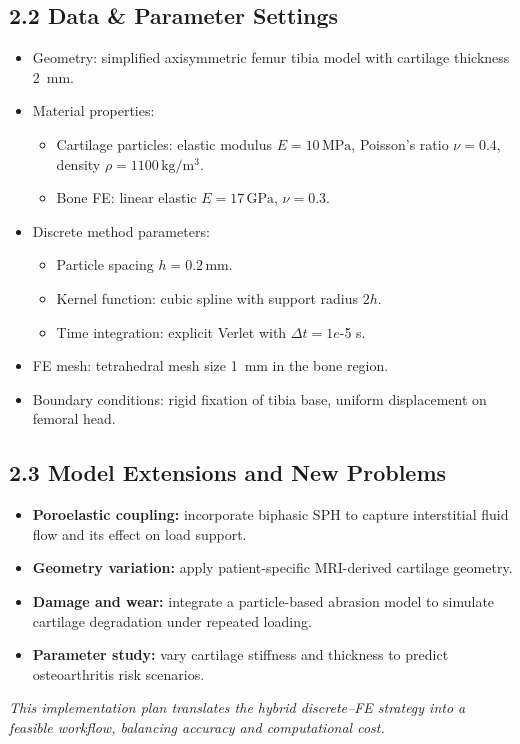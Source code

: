 \documentclass[11pt]{article}
\begin{document}
\subsection*{2.2 Data \& Parameter Settings}
\begin{itemize}
  \item Geometry: simplified axisymmetric femur tibia model with cartilage thickness \SI{2}{mm}.
  \item Material properties:
    \begin{itemize}
      \item Cartilage particles: elastic modulus $E=10\,\mathrm{MPa}$, Poisson's ratio $\nu=0.4$, density $\rho=1100\,\mathrm{kg/m^3}$.
      \item Bone FE: linear elastic $E=17\,\mathrm{GPa}$, $\nu=0.3$.
    \end{itemize}
  \item Discrete method parameters:
    \begin{itemize}
      \item Particle spacing $h=0.2\,\mathrm{mm}$.
      \item Kernel function: cubic spline with support radius $2h$.
      \item Time integration: explicit Verlet with $\Delta t=1e$-5 s.
    \end{itemize}
  \item FE mesh: tetrahedral mesh size \SI{1}{mm} in the bone region.
  \item Boundary conditions: rigid fixation of tibia base, uniform displacement on femoral head.
\end{itemize}

\subsection*{2.3 Model Extensions and New Problems}
\begin{itemize}
  \item \textbf{Poroelastic coupling:} incorporate biphasic SPH to capture interstitial fluid flow and its effect on load support.
  \item \textbf{Geometry variation:} apply patient-specific MRI-derived cartilage geometry.
  \item \textbf{Damage and wear:} integrate a particle-based abrasion model to simulate cartilage degradation under repeated loading.
  \item \textbf{Parameter study:} vary cartilage stiffness and thickness to predict osteoarthritis risk scenarios.
\end{itemize}

\vfill
\noindent\textit{This implementation plan translates the hybrid discrete–FE strategy into a feasible workflow, balancing accuracy and computational cost.}
\end{document}

